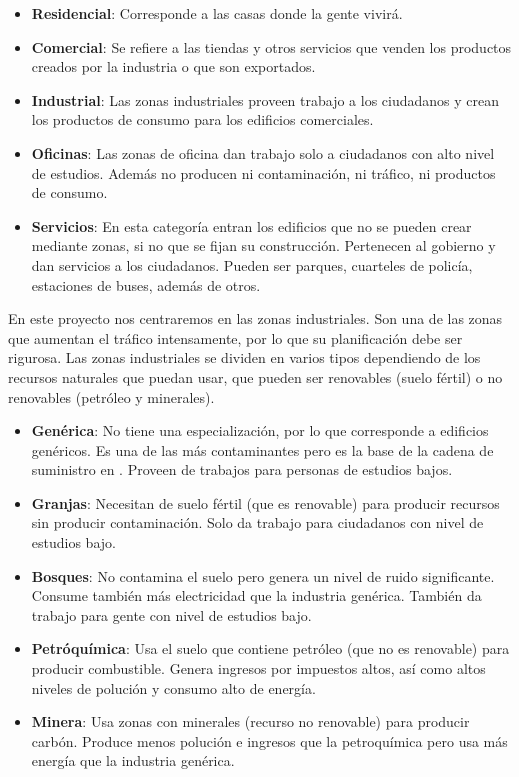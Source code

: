 \begin{itemize}
	\item \textbf{Residencial}: Corresponde a las casas donde la gente vivirá.
	\item \textbf{Comercial}: Se refiere a las tiendas y otros servicios que venden los productos creados por la industria o que son exportados.
	\item \textbf{Industrial}: Las zonas industriales proveen trabajo a los ciudadanos y crean los productos de consumo para los edificios comerciales.
	\item \textbf{Oficinas}: Las zonas de oficina dan trabajo solo a ciudadanos con alto nivel de estudios. Además no producen ni contaminación, ni tráfico, ni productos de consumo.
	\item \textbf{Servicios}: En esta categoría entran los edificios que no se pueden crear mediante zonas, si no que se fijan su construcción. Pertenecen al gobierno y dan servicios a los ciudadanos. Pueden ser parques, cuarteles de policía, estaciones de buses, además de otros.
\end{itemize}

En este proyecto nos centraremos en las zonas industriales. Son una de las zonas que aumentan el tráfico intensamente, por lo que su planificación debe ser rigurosa. Las zonas industriales se dividen en varios tipos dependiendo de los recursos naturales que puedan usar, que pueden ser renovables (suelo fértil) o no renovables (petróleo y minerales).

\begin{itemize}
	\item \textbf{Genérica}: No tiene una especialización, por lo que corresponde a edificios genéricos. Es una de las más contaminantes pero es la base de la cadena de suministro en \cities. Proveen de trabajos para personas de estudios bajos.
	\item \textbf{Granjas}: Necesitan de suelo fértil (que es renovable) para producir recursos sin producir contaminación. Solo da trabajo para ciudadanos con nivel de estudios bajo.
	\item \textbf{Bosques}: No contamina el suelo pero genera un nivel de ruido significante. Consume también más electricidad que la industria genérica. También da trabajo para gente con nivel de estudios bajo.
	\item \textbf{Petróquímica}: Usa el suelo que contiene petróleo (que no es renovable) para producir combustible. Genera ingresos por impuestos altos, así como altos niveles de polución y consumo alto de energía.
	\item \textbf{Minera}: Usa zonas con minerales (recurso no renovable) para producir carbón. Produce menos polución e ingresos que la petroquímica pero usa más energía que la industria genérica.
\end{itemize}


